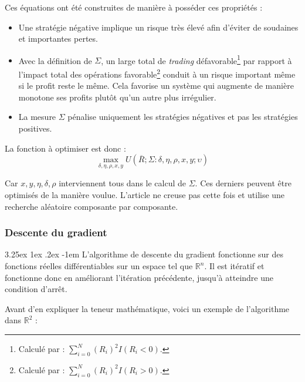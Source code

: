 \documentclass[a4paper, 11pt]{article}
\makeatletter
\renewcommand\paragraph{\@startsection{paragraph}{5}{\z@}%
  {3.25ex \@plus1ex \@minus.2ex}%
  {-1em}%
  {\normalfont\normalsize\bfseries}}
\makeatother
\begin{document}
Ces équations ont été construites de manière à posséder ces propriétés \cite{fx_trading}:
\begin{itemize}
 \item Une stratégie négative implique un risque très élevé afin d'éviter de soudaines et importantes pertes.
 
 \item Avec la définition de $\Sigma$, un large total de \textit{trading} défavorable\footnote{Calculé par :
 $\sum_{i=0}^N (R_i)^2 I(R_i < 0)$.} par rapport à l'impact total des opérations favorable\footnote{Calculé par :
 $\sum_{i=0}^N (R_i)^2 I(R_i > 0)$.} conduit à un risque important même si le profit reste le même. Cela favorise un système
 qui augmente de manière monotone ses profits plutôt qu'un autre plus irrégulier.
 
 \item La mesure $\Sigma$ pénalise uniquement les stratégies négatives et pas les stratégies positives. 
\end{itemize}

La fonction à optimiser est donc :
$$\max_{\delta, \eta, \rho, x, y} U(\overline{R};\Sigma: \delta, \eta, \rho, x, y; \upsilon)$$

Car $x,y,\eta,\delta,\rho$ interviennent tous dans le calcul de $\Sigma$. Ces derniers peuvent être optimisés de la manière voulue.
L'article ne creuse pas cette fois et utilise une recherche aléatoire composante par composante.

\subsubsection{Descente du gradient}\label{section descente du gradient}
\paragraph{}
L'algorithme de descente du gradient fonctionne sur des fonctions réelles différentiables sur un espace tel
que $\mathbb{R}^n$. Il est itératif et fonctionne donc en améliorant l'itération précédente, jusqu'à
atteindre une condition d'arrêt.

Avant d'en expliquer la teneur mathématique, voici un exemple de l'algorithme dans $\mathbb{R}^2$ :
\end{document}
